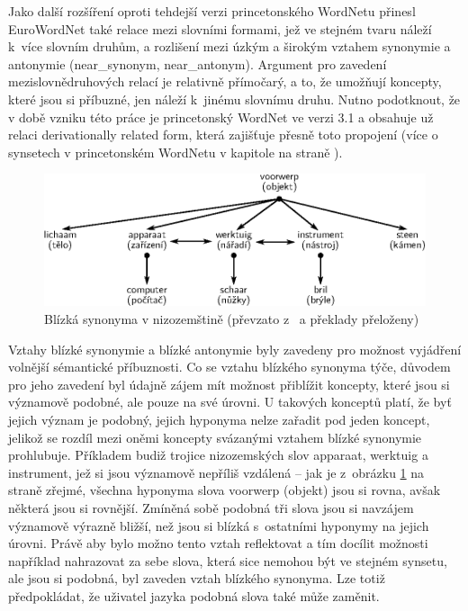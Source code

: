 \documentclass[a4paper, 11pt, oneside, showtrims]{book}
\newcommand{\itNameRef}[1]{\textit{\nameref{#1}}}
\newcommand\ex{\textsf}
\begin{document}

				Jako další rozšíření oproti tehdejší verzi princetonského WordNetu přinesl EuroWordNet také relace mezi slovními formami, jež ve stejném tvaru náleží k~více slovním druhům, a rozlišení mezi úzkým a širokým vztahem synonymie a antonymie (\ex{near\_synonym}, \ex{near\_antonym}). Argument pro zavedení mezislovnědruhových relací je relativně přímočarý, a to, že umožňují  koncepty, které jsou si příbuzné, jen náleží k~jinému slovnímu druhu. Nutno podotknout, že v době vzniku této práce je princetonský WordNet ve verzi 3.1 a obsahuje už relaci \ex{derivationally related form}, která zajišťuje přesně toto propojení (více o synsetech v princetonském WordNetu v kapitole \itNameRef{cha:princeton-synset-rels} na straně \pageref{cha:princeton-synset-rels}). 

				\begin{figure}[h]
					\centering
					\includegraphics[width=1.0\textwidth]{pazienza-wn-study.eps}
					\caption{Blízká synonyma v nizozemštině (převzato z~\textcite{pazienza2008bottom} a překlady přeloženy)}
					\label{fig:near-synon}
				\end{figure}

				Vztahy blízké synonymie a blízké antonymie byly zavedeny pro možnost vyjádření volnější sémantické příbuznosti. \parencite{pazienza2008bottom} Co se vztahu blízkého synonyma  týče, důvodem pro jeho zavedení byl údajně zájem mít možnost přiblížit koncepty, které jsou si významově podobné, ale pouze na své úrovni. U takových konceptů platí, že byť jejich význam je podobný, jejich hyponyma nelze zařadit pod jeden koncept, jelikož se rozdíl mezi oněmi koncepty svázanými vztahem blízké synonymie prohlubuje. Příkladem budiž trojice nizozemských slov \ex{apparaat}, \ex{werktuig} a \ex{instrument}, jež si jsou významově nepříliš vzdálená -- jak je z~obrázku \ref{fig:near-synon} na straně \pageref{fig:near-synon} zřejmé, všechna hyponyma slova \ex{voorwerp} (\ex{objekt}) jsou si rovna, avšak některá jsou si rovnější. Zmíněná sobě podobná tři slova jsou si navzájem významově výrazně bližší, než jsou si blízká s~ostatními hyponymy na jejich úrovni. Právě aby bylo možno tento vztah reflektovat a tím docílit možnosti například nahrazovat za sebe slova, která sice nemohou být ve stejném synsetu, ale jsou si podobná, byl zaveden vztah blízkého synonyma. Lze totiž předpokládat, že uživatel jazyka podobná slova také může zaměnit. \parencite{vossen1997eurowordnet}
\end{document}
